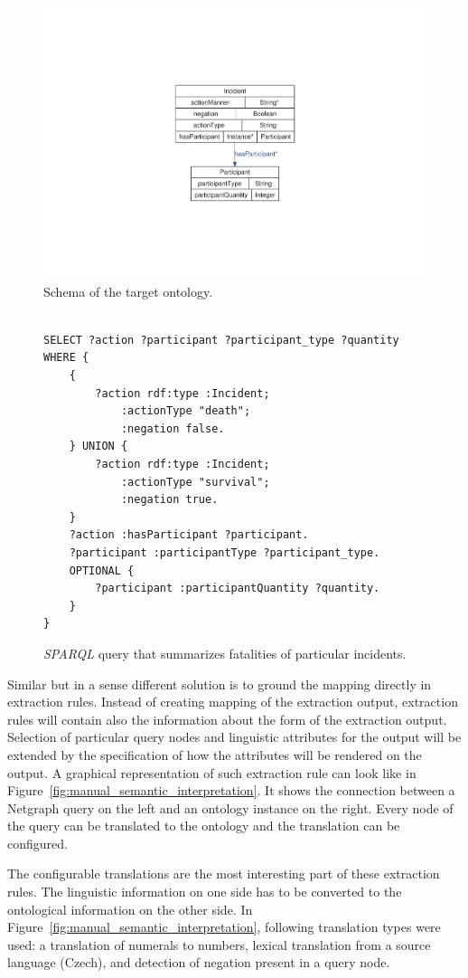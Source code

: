 \begin{figure}
	\centering
		\includegraphics[angle=-90, width=0.3\hsize]{classes}
	\caption{Schema of the target ontology.}
	\label{fig:manual_classes}
\end{figure}

\begin{figure}
\begin{verbatim}

SELECT ?action ?participant ?participant_type ?quantity
WHERE {
	{
		?action rdf:type :Incident;
			:actionType "death";
			:negation false.
	} UNION {
		?action rdf:type :Incident;
			:actionType "survival";
			:negation true.
	}
	?action :hasParticipant ?participant.
	?participant :participantType ?participant_type.
	OPTIONAL {
		?participant :participantQuantity ?quantity.
	}
}
\end{verbatim}
\caption{\emph{SPARQL} query that summarizes fatalities of particular incidents.}
\label{fig:sparql_aggregation}
\end{figure}



Similar but in a sense different solution is to ground the mapping directly in extraction rules. Instead of creating mapping of the extraction output, extraction rules will contain also the information about the form of the extraction output. Selection of particular query nodes and linguistic attributes for the output will be extended by the specification of how the attributes will be rendered on the output. A graphical representation of such extraction rule can look like in Figure~\ref{fig:manual_semantic_interpretation}. It shows the connection between a Netgraph query on the left and an ontology instance on the right. Every node of the query can be translated to the ontology and the translation can be configured. 

The configurable translations are the most interesting part of these extraction rules. The linguistic information on one side has to be converted to the ontological information on the other side. In Figure~\ref{fig:manual_semantic_interpretation}, following translation types were used: a translation of numerals to numbers, lexical translation from a source language (Czech), and detection of negation present in a query node.

